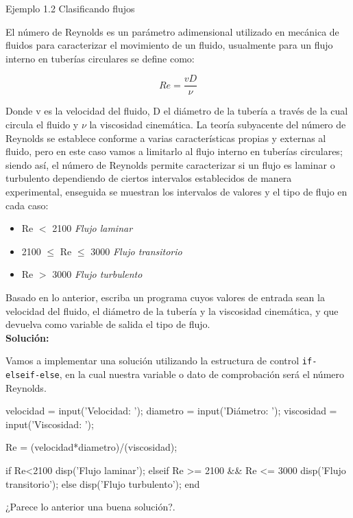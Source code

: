 \begin{ejemplo}{Ejemplo 1.2 Clasificando flujos}

El número de Reynolds es un parámetro adimensional utilizado en
mecánica de fluidos para caracterizar el movimiento de un fluido,
usualmente para un flujo interno en tuberías circulares se define como:

$$ Re=\frac{vD}{\nu} $$

Donde v es la velocidad del fluido, D el diámetro de la tubería a
través de la cual circula el fluido y $\nu$ la viscosidad cinemática.
La teoría subyacente del número de Reynolds se establece conforme a
varias características propias y externas al fluido, pero en este caso
vamos a limitarlo al flujo interno en tuberías circulares; siendo así,
el número de Reynolds permite caracterizar si un flujo es laminar o
turbulento dependiendo de ciertos intervalos establecidos de manera
experimental, enseguida se muestran los intervalos de valores y el
tipo de flujo en cada caso:

\begin{itemize}
\item Re $<$ 2100  \textit{Flujo laminar}
\item 2100 $\leq$ Re $\leq$ 3000   \textit{Flujo transitorio}
\item Re $>$ 3000   \textit{Flujo turbulento}
\end{itemize}

Basado en lo anterior, escriba un programa cuyos valores de entrada
sean la velocidad del fluido, el diámetro de la tubería y la
viscosidad cinemática, y que devuelva como variable de salida el tipo
de flujo.\\

\textbf{Solución:}

Vamos a implementar una solución utilizando la estructura de control 
\texttt{if-elseif-else}, en la cual nuestra variable o dato de comprobación 
será el número Reynolds.

\begin{matlab}
velocidad = input('Velocidad: ');
diametro = input('Diámetro: ');
viscosidad = input('Viscosidad: ');

Re = (velocidad*diametro)/(viscosidad);

if Re<2100
   disp('Flujo laminar');
elseif Re >= 2100 && Re <= 3000
   disp('Flujo transitorio');
else
   disp('Flujo turbulento');
end
\end{matlab}

¿Parece lo anterior una buena solución?.\\


\end{ejemplo}
